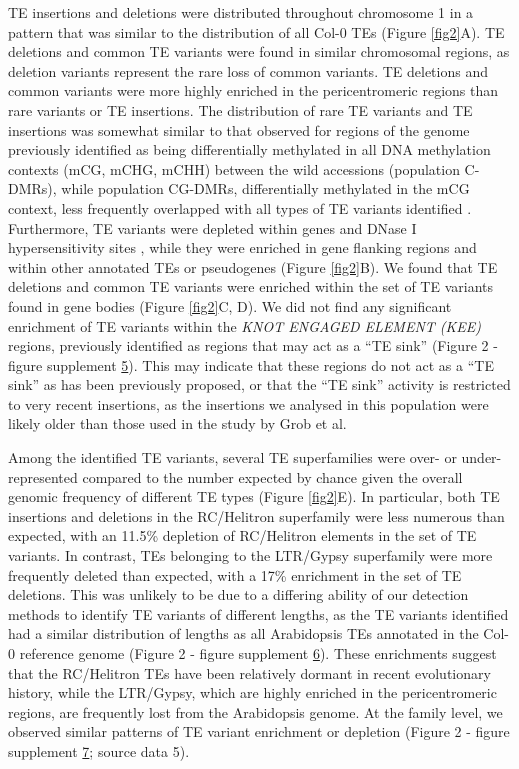 \documentclass[12pt]{article}
\begin{document}
TE insertions and deletions were distributed throughout chromosome 1 in
a pattern that was similar to the distribution of all Col-0 TEs (Figure
\ref{fig2}A). TE deletions and common TE variants were found in similar
chromosomal regions, as deletion variants represent the rare loss of
common variants. TE deletions and common variants were more highly
enriched in the pericentromeric regions than rare variants or TE
insertions. The distribution of rare TE variants and TE insertions was
somewhat similar to that observed for regions of the genome previously
identified as being differentially methylated in all DNA methylation
contexts (mCG, mCHG, mCHH) between the wild accessions (population
C-DMRs), while population CG-DMRs, differentially methylated in the mCG
context, less frequently overlapped with all types of TE variants
identified \cite{Schmitz:2013iu}. Furthermore, TE variants were depleted
within genes and DNase I hypersensitivity sites \cite{Sullivan:2014ii},
while they were enriched in gene flanking regions and within other
annotated TEs or pseudogenes (Figure \ref{fig2}B). We found that TE deletions and
common TE variants were enriched within the set of TE variants found in
gene bodies (Figure \ref{fig2}C, D). We did not find any significant enrichment
of TE variants within the \emph{KNOT ENGAGED ELEMENT (KEE)} regions,
previously identified as regions that may act as a ``TE sink''
\cite{Grob:2014kg} (Figure 2 - figure supplement \hyperref[fig2s5]{5}). This may indicate
that these regions do not act as a ``TE sink'' as has been previously
proposed, or that the ``TE sink'' activity is restricted to very recent
insertions, as the insertions we analysed in this population were likely
older than those used in the study by Grob et al.

Among the identified TE variants, several TE superfamilies were over- or
under-represented compared to the number expected by chance given the
overall genomic frequency of different TE types (Figure \ref{fig2}E). In
particular, both TE insertions and deletions in the RC/Helitron
superfamily were less numerous than expected, with an 11.5\% depletion
of RC/Helitron elements in the set of TE variants. In contrast, TEs
belonging to the LTR/Gypsy superfamily were more frequently deleted than
expected, with a 17\% enrichment in the set of TE deletions. This was
unlikely to be due to a differing ability of our detection methods to
identify TE variants of different lengths, as the TE variants identified
had a similar distribution of lengths as all Arabidopsis TEs annotated
in the Col-0 reference genome (Figure 2 - figure supplement \hyperref[fig2s6]{6}). These
enrichments suggest that the RC/Helitron TEs have been relatively
dormant in recent evolutionary history, while the LTR/Gypsy, which are
highly enriched in the pericentromeric regions, are frequently lost from
the Arabidopsis genome. At the family level, we observed similar
patterns of TE variant enrichment or depletion (Figure 2 - figure
supplement \hyperref[fig2s7]{7}; source data 5).
\end{document}
